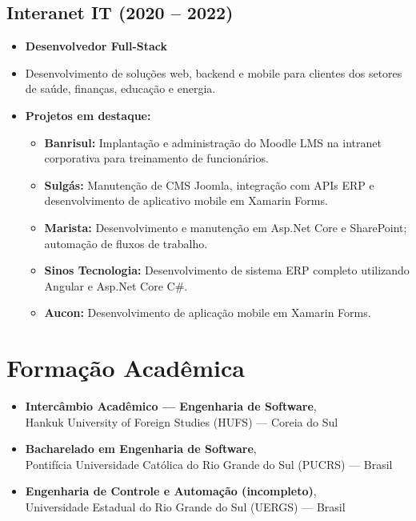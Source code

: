 \documentclass[a4paper,10pt]{article}
\begin{document}
\subsection*{Interanet IT (2020 -- 2022)}
\begin{itemize}[leftmargin=1cm]
    \item \textbf{Desenvolvedor Full-Stack}
    \item Desenvolvimento de soluções web, backend e mobile para clientes dos setores de saúde, finanças, educação e energia.
    \item \textbf{Projetos em destaque:}
    \begin{itemize}
        \item \textbf{Banrisul:} Implantação e administração do Moodle LMS na intranet corporativa para treinamento de funcionários.
        \item \textbf{Sulgás:} Manutenção de CMS Joomla, integração com APIs ERP e desenvolvimento de aplicativo mobile em Xamarin Forms.
        \item \textbf{Marista:} Desenvolvimento e manutenção em Asp.Net Core e SharePoint; automação de fluxos de trabalho.
        \item \textbf{Sinos Tecnologia:} Desenvolvimento de sistema ERP completo utilizando Angular e Asp.Net Core C\#.
        \item \textbf{Aucon:} Desenvolvimento de aplicação mobile em Xamarin Forms.
    \end{itemize}
\end{itemize}

\section*{Formação Acadêmica}

\begin{itemize}[leftmargin=2cm]
    \item[2026] \textbf{Intercâmbio Acadêmico --- Engenharia de Software}, \\
    Hankuk University of Foreign Studies (HUFS) --- Coreia do Sul
    \item[2023--Atual] \textbf{Bacharelado em Engenharia de Software}, \\
    Pontifícia Universidade Católica do Rio Grande do Sul (PUCRS) --- Brasil
    \item[2020--2022] \textbf{Engenharia de Controle e Automação (incompleto)}, \\
    Universidade Estadual do Rio Grande do Sul (UERGS) --- Brasil
\end{itemize}
\end{document}
